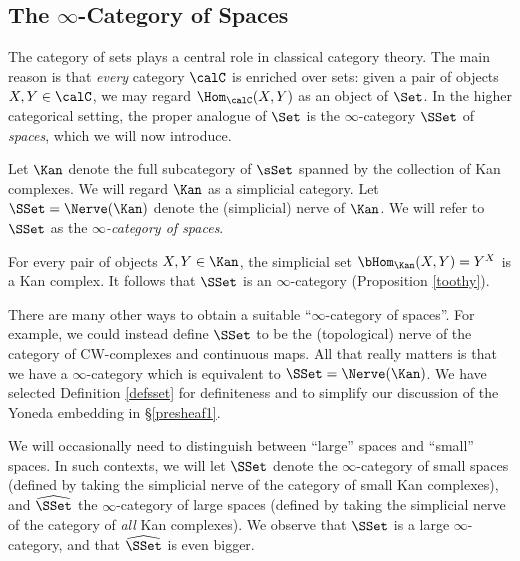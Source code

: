 \subsection{The $\infty$-Category of Spaces}\label{introducingspaces}

The category of sets plays a central role in classical category theory. The main reason
is that {\em every} category $\calC$ is enriched over sets: given a pair of objects
$X,Y \in \calC$, we may regard $\Hom_{\calC}(X,Y)$ as an object of $\Set$.
In the higher categorical setting, the proper analogue of $\Set$ is the
$\infty$-category $\SSet$ of {\it spaces}, which we will now
introduce.

\begin{definition}\label{defsset}
Let $\Kan$ denote the full subcategory of $\sSet$ spanned by the collection of Kan complexes. 
We will regard $\Kan$ as a simplicial category. Let $\SSet = \Nerve(\Kan)$ denote the (simplicial) nerve of $\Kan$. We will refer to $\SSet$ as the {\it $\infty$-category of spaces}.
\end{definition}

\begin{remark}
For every pair of objects $X,Y \in \Kan$, the simplicial set
$\bHom_{\Kan}(X,Y) = Y^X$ is a Kan complex. It follows that
$\SSet$ is an $\infty$-category (Proposition \ref{toothy}).
\end{remark}

\begin{remark}
There are many other ways to obtain a suitable ``$\infty$-category of
spaces''. For example, we could instead define $\SSet$ to be the (topological) nerve
of the category of CW-complexes and continuous maps.
All that really matters is that we have a $\infty$-category which is equivalent to $\SSet = \Nerve(\Kan)$. 
We have selected Definition \ref{defsset} for definiteness and to simplify our discussion of the
Yoneda embedding in \S \ref{presheaf1}.
\end{remark}

\begin{remark}
We will occasionally need to distinguish between ``large'' spaces and ``small'' spaces.
In such contexts, we will let $\SSet$ denote the $\infty$-category of small spaces (defined
by taking the simplicial nerve of the category of small Kan complexes), and $\widehat{\SSet}$ the $\infty$-category of large spaces (defined by taking the simplicial nerve of the
category of {\em all} Kan complexes). We observe that $\SSet$ is a large $\infty$-category, and that
$\widehat{\SSet}$ is even bigger.
\end{remark}

